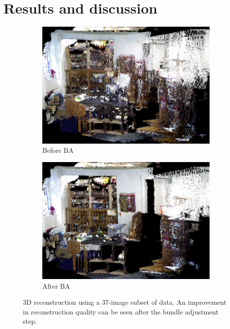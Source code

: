 \documentclass[10pt,twocolumn,letterpaper]{article}
\begin{document}

\section{Results and discussion}

\begin{figure}
\centering

   \begin{subfigure}[b]{1.0\columnwidth}
   \includegraphics[width=\textwidth]{figures/result_small_noBA.png}
   \caption{Before BA}
   \label{fig:beforeBA}
   \end{subfigure}
   \hfill
   \begin{subfigure}[b]{1.0\columnwidth}
   \includegraphics[width=\textwidth]{figures/result_small_BA_noD.png}
   \caption{After BA}
   \label{fig:afterBA}
   \end{subfigure}

\caption{3D reconstruction using a 37-image subset of data. An improvement in
reconstruction quality can be seen after the bundle adjustment step.}
\label{fig:3Dsmall}
\end{figure}
\end{document}
